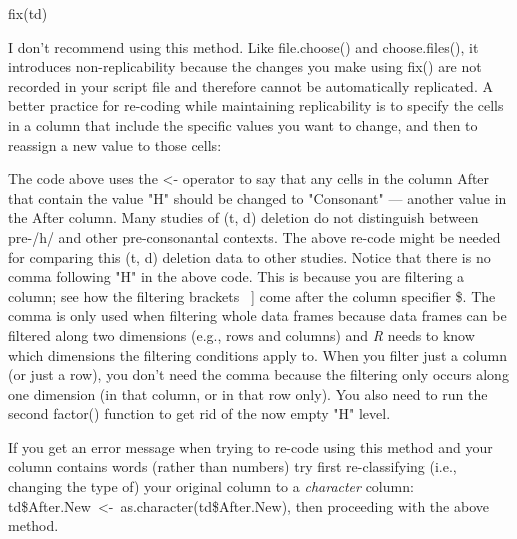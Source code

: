 \documentclass[
  12pt,
  letterpaper]{article}
\newenvironment{Shaded}{\begin{snugshade}}{\end{snugshade}}
\newcommand{\FunctionTok}[1]{\textcolor[rgb]{0.28,0.35,0.67}{#1}}
\newcommand{\NormalTok}[1]{\textcolor[rgb]{0.00,0.23,0.31}{#1}}
\newcommand{\OtherTok}[1]{\textcolor[rgb]{0.00,0.23,0.31}{#1}}
\newcommand{\SpecialCharTok}[1]{\textcolor[rgb]{0.37,0.37,0.37}{#1}}
\newcommand{\StringTok}[1]{\textcolor[rgb]{0.13,0.47,0.30}{#1}}
\renewcommand\texttt[1]{{\ttfamily\color{BrickRed}#1}}
\begin{document}
\begin{Shaded}
\begin{Highlighting}[]
\FunctionTok{fix}\NormalTok{(td)}
\end{Highlighting}
\end{Shaded}

I don't recommend using this method. Like \texttt{file.choose()} and
\texttt{choose.files()}, it introduces non-replicability because the
changes you make using \texttt{fix()} are not recorded in your script
file and therefore cannot be automatically replicated. A better practice
for re-coding while maintaining replicability is to specify the cells in
a column that include the specific values you want to change, and then
to reassign a new value to those cells:

\begin{Shaded}
\end{Shaded}

The code above uses the \texttt{\textless{}-} operator to say that any
cells in the column \texttt{After} that contain the value \texttt{"H"}
should be changed to \texttt{"Consonant"} --- another value in the
\texttt{After} column. Many studies of (t, d) deletion do not
distinguish between pre-/h/ and other pre-consonantal contexts. The
above re-code might be needed for comparing this (t, d) deletion data to
other studies. Notice that there is no comma following \texttt{"H"} in
the above code. This is because you are filtering a column; see how the
filtering brackets \texttt{{[}\ {]}} come after the column specifier
\texttt{\$}. The comma is only used when filtering whole data frames
because data frames can be filtered along two dimensions (e.g., rows and
columns) and \emph{R} needs to know which dimensions the filtering
conditions apply to. When you filter just a column (or just a row), you
don't need the comma because the filtering only occurs along one
dimension (in that column, or in that row only). You also need to run
the second \texttt{factor()} function to get rid of the now empty
\texttt{"H"} level.

If you get an error message when trying to re-code using this method and
your column contains words (rather than numbers) try first
re-classifying (i.e., changing the type of) your original column to a
\emph{character} column:
\texttt{td\$After.New\ \textless{}-\ as.character(td\$After.New)}, then
proceeding with the above method.
\end{document}
